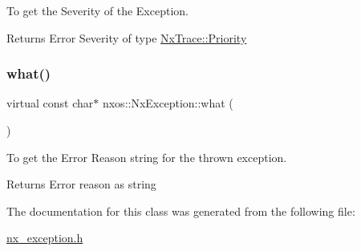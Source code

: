 To get the Severity of the Exception.

\begin{DoxyReturn}{Returns}
Error Severity of type \mbox{\hyperlink{classnxos_1_1_nx_trace_a582f6e5a22e788c61807657f8bca088f}{Nx\+Trace\+::\+Priority}} 
\end{DoxyReturn}
\mbox{\label{classnxos_1_1_nx_exception_ad475b90fb193848245b9537524439943}} 
\subsubsection{\texorpdfstring{what()}{what()}}
{\footnotesize\ttfamily virtual const char$\ast$ nxos\+::\+Nx\+Exception\+::what (\begin{DoxyParamCaption}{ }\end{DoxyParamCaption})\hspace{0.3cm}{\ttfamily [pure virtual]}}

To get the Error Reason string for the thrown exception.

\begin{DoxyReturn}{Returns}
Error reason as string 
\end{DoxyReturn}


The documentation for this class was generated from the following file\+:\begin{DoxyCompactItemize}
\item 
\mbox{\hyperlink{nx__exception_8h}{nx\+\_\+exception.\+h}}\end{DoxyCompactItemize}

